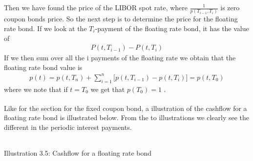 Then we have found the price of the LIBOR spot rate, where $\frac{1}{p(T_{i-1},T_i)}$ is zero coupon bonds price. 
So the next step is to determine the price for the floating rate bond. If we look at the $T_i$-payment of the floating rate bond, 
it has the value of
\begin{align*}
    P(t,T_{i-1})-P(t,T_i)
\end{align*}
If we then sum over all the i payments of the floating rate we obtain that the floating rate bond value is
\begin{align*}
    p(t)= p(t,T_n) + \sum_{i=1}^{n}\Big[p(t,T_{i-1})-p(t,T_i)\Big] = p(t,T_0) 
\end{align*}
where we note that if $t=T_0$ we get that $p(T_0)=1$ \cite{Bjork}. \\\\
Like for the section for the fixed coupon bond, a illustration of the cashflow for a floating rate bond is illustrated below.
From the to illustrations we clearly see the different in the periodic interest payments. 
\begin{center}
    \\[10pt] 
    Illustration 3.5: Cashflow for a floating rate bond
\end{center}
\newpage
